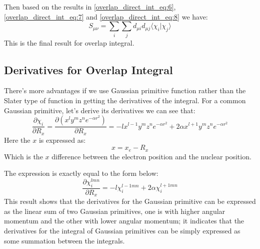 Then based on the results in \ref{overlap_direct_int_eq:6}, \ref{overlap_direct_int_eq:7} 
and \ref{overlap_direct_int_eq:8}
we have:
\begin{equation}
 \label{overlap_direct_int_eq:12}
 S_{\mu\nu} = \sum_{i}\sum_{j}d_{\mu i}d_{\mu j}\langle\chi_{i}|\chi_{j}\rangle
\end{equation}
This is the final result for overlap integral.

\subsection{Derivatives for Overlap Integral} 

There's more advantages if we use Gaussian primitive function rather than the Slater type of function
in getting the derivatives of the integral. For a common Gaussian primitive, let's derive its 
derivatives we can see that:
\begin{equation}
 \label{derivative_overlap_direct_int_eq:1}
\frac{\partial \chi_{i}}{\partial R_{x}} = \frac{\partial (x^{l}y^{m}z^{n}e^{-\alpha r^{2}})}
{\partial R_{x}} =  -lx^{l-1}y^{m}z^{n}e^{-\alpha r^{2}} + 2\alpha x^{l+1}y^{m}z^{n}e^{-\alpha r^{2}}
\end{equation}
Here the $x$ is expressed as:
\begin{equation}
 x = x_{e} - R_{x} 
\end{equation}
Which is the $x$ difference between the electron position and the nuclear position. 

The expression is exactly equal to the form below:
\begin{equation}
 \label{derivative_overlap_direct_int_eq:2}
\frac{\partial \chi^{lmn}_{i}}{\partial R_{x}} = -l\chi_{i}^{l-1mn} + 2\alpha\chi_{i}^{l+1mn}
\end{equation}
This result shows that the derivatives for the Gaussian primitive can be expressed as the linear 
sum of two Gaussian primitives, one is with higher angular momentum and the other with lower
angular momentum; it indicates that the derivatives for the integral of Gaussian primitives 
can be simply expressed as some summation between the integrals.

